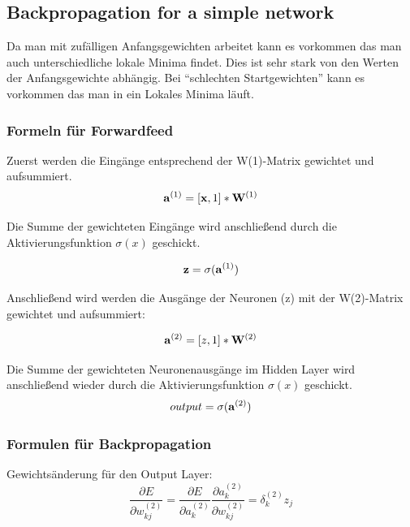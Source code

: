 \subsection{Backpropagation for a simple network}


Da man mit zufälligen Anfangsgewichten arbeitet kann es vorkommen das man auch unterschiedliche lokale Minima findet.
Dies ist sehr stark von den Werten der Anfangsgewichte abhängig. Bei ``schlechten Startgewichten'' kann es vorkommen das man in ein Lokales Minima läuft.

\subsubsection{Formeln für Forwardfeed}

Zuerst werden die Eingänge entsprechend der W(1)-Matrix gewichtet und aufsummiert.
\begin{equation}
\mathbf{a}^{(1)} = [\mathbf{x},1] * \mathbf{W}^{(1)}
\end{equation}

Die Summe der gewichteten Eingänge wird anschließend durch die Aktivierungsfunktion $\sigma(x)$ geschickt.

\begin{equation}
\mathbf{z} = \sigma(\mathbf{a}^{(1)})
\end{equation}

Anschließend wird werden die Ausgänge der Neuronen (z) mit der W(2)-Matrix gewichtet und aufsummiert:

\begin{equation}
 \mathbf{a}^{(2)} = [z,1] * \mathbf{W}^{(2)}
\end{equation}

Die Summe der gewichteten Neuronenausgänge im Hidden Layer wird anschließend wieder durch die Aktivierungsfunktion $\sigma(x)$ geschickt.
\begin{equation}
 output = \sigma(\mathbf{a}^{(2)})
\end{equation}



\subsubsection{Formulen für Backpropagation}

Gewichtsänderung für den Output Layer:
\begin{equation}
 \frac{\partial E}{\partial w_{kj}^{(2)}} = \frac{\partial E}{\partial a_{k}^{(2)}} \frac{\partial a_{k}^{(2)}}{\partial w_{kj}^{(2)}} = \delta_k^{(2)} z_j
\end{equation}


